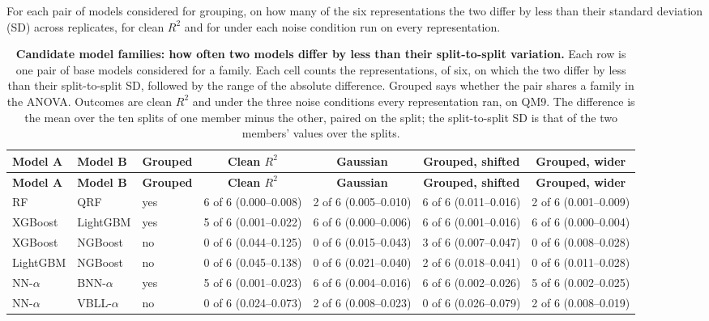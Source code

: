\begin{landscape}
\label{app:noise:sec:model_redundancy}
For each pair of models considered for grouping, on how many of the six representations the two differ by less than their standard deviation (SD) across replicates, for clean $R^2$ and for \aucnorm{} under each noise condition run on every representation.
{\AFtablefont
\begin{longtable}{lllcccc}
\caption{\textbf{Candidate model families: how often two models differ by less than their split-to-split variation.}
Each row is one pair of base models considered for a family. Each cell counts the representations, of six, on which the two differ by less than their split-to-split SD, followed by the range of the absolute difference. Grouped says whether the pair shares a family in the ANOVA. Outcomes are clean $R^2$ and \aucnorm{} under the three noise conditions every representation ran, on QM9. The difference is the mean over the ten splits of one member minus the other, paired on the split; the split-to-split SD is that of the two members' values over the splits.}
\label{app:noise:family_pairs_models}\\
\toprule
\textbf{Model A} & \textbf{Model B} & \textbf{Grouped} & \textbf{Clean $R^2$} & \textbf{Gaussian} & \textbf{Grouped, shifted} & \textbf{Grouped, wider} \\
\midrule
\endfirsthead
\toprule
\textbf{Model A} & \textbf{Model B} & \textbf{Grouped} & \textbf{Clean $R^2$} & \textbf{Gaussian} & \textbf{Grouped, shifted} & \textbf{Grouped, wider} \\
\midrule
\endhead
RF & QRF & yes & 6 of 6 (0.000--0.008) & 2 of 6 (0.005--0.010) & 6 of 6 (0.011--0.016) & 2 of 6 (0.001--0.009) \\
XGBoost & LightGBM & yes & 5 of 6 (0.001--0.022) & 6 of 6 (0.000--0.006) & 6 of 6 (0.001--0.016) & 6 of 6 (0.000--0.004) \\
XGBoost & NGBoost & no & 0 of 6 (0.044--0.125) & 0 of 6 (0.015--0.043) & 3 of 6 (0.007--0.047) & 0 of 6 (0.008--0.028) \\
LightGBM & NGBoost & no & 0 of 6 (0.045--0.138) & 0 of 6 (0.021--0.040) & 2 of 6 (0.018--0.041) & 0 of 6 (0.011--0.028) \\
NN-$\alpha$ & BNN-$\alpha$ & yes & 5 of 6 (0.001--0.023) & 6 of 6 (0.004--0.016) & 6 of 6 (0.002--0.026) & 5 of 6 (0.002--0.025) \\
NN-$\alpha$ & VBLL-$\alpha$ & no & 0 of 6 (0.024--0.073) & 2 of 6 (0.008--0.023) & 0 of 6 (0.026--0.079) & 2 of 6 (0.008--0.019) \\

\end{longtable}}
\end{landscape}
